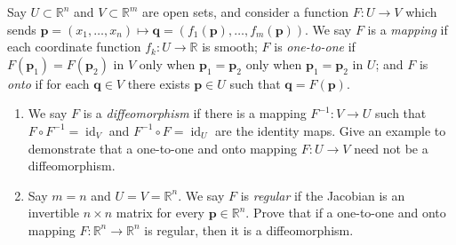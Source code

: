 \documentclass[12 pt, letterpaper]{hmcpset}
\begin{document}
\begin{problem}[Problem 1.]
	Say $U \subset \mathbb{R}^n$ and $V \subset \mathbb{R}^m$ are open sets, and consider a function $F : U \to V$ which sends $\mathbf{p} = (x_1, \dots, x_n) \mapsto \mathbf{q} = (f_1(\mathbf{p}), \dots, f_m(\mathbf{p}))$. We say $F$ is a \textit{mapping} if each coordinate function $f_k : U \to \mathbb{R}$ is smooth; $F$ is \textit{one-to-one} if $F(\mathbf{p}_1) = F(\mathbf{p}_2)$ in $V$ only when $\mathbf{p}_1 = \mathbf{p}_2$ only when $\mathbf{p}_1 = \mathbf{p}_2$ in $U$; and  $F$ is \textit{onto} if for each $\mathbf{q} \in V$ there exists $\mathbf{p} \in U$ such that $\mathbf{q} = F(\mathbf{p})$.
	\begin{enumerate}
		\item We say $F$ is a \textit{diffeomorphism} if there is a mapping $F^{-1} : V \to U$ such that $F \circ F^{-1} = \operatorname{id}_V$ and $F^{-1} \circ F = \operatorname{id}_U$ are the identity maps. Give an example to demonstrate that a one-to-one and onto mapping $F : U \to V$ need not be a diffeomorphism.
		\item Say $m = n$ and $U = V = \mathbb{R}^n$. We say $F$ is \textit{regular} if the Jacobian is an invertible $n \times n$ matrix for every $\mathbf{p} \in \mathbb{R}^n$. Prove that if a one-to-one and onto mapping $F : \mathbb{R}^n \to \mathbb{R}^n$ is regular, then it is a diffeomorphism.
	\end{enumerate}
\end{problem}
\end{document}
